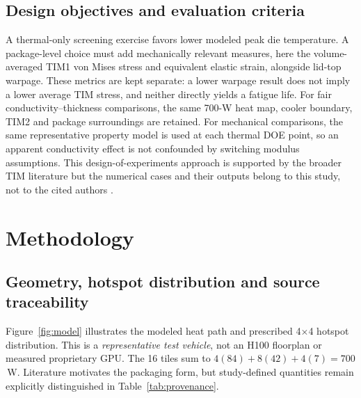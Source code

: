 \documentclass[10pt,a4paper]{article}
\begin{document}
\subsection{Design objectives and evaluation criteria}
A thermal-only screening exercise favors lower modeled peak die temperature. A package-level choice must
add mechanically relevant measures, here the volume-averaged TIM1 von Mises stress and equivalent elastic strain,
alongside lid-top warpage. These metrics are kept separate: a lower warpage result does not imply a lower
average TIM stress, and neither directly yields a fatigue life. For fair conductivity--thickness comparisons,
the same 700-W heat map, cooler boundary, TIM2 and package surroundings are retained.
For mechanical comparisons, the same representative property model is used at each thermal DOE point,
so an apparent conductivity effect is not confounded by switching modulus assumptions.
This design-of-experiments approach is supported by the broader TIM literature but the numerical cases
and their outputs belong to this study, not to the cited authors \citep{prasher2006,subramanian2019}.

\section{Methodology}
\subsection{Geometry, hotspot distribution and source traceability}
Figure~\ref{fig:model} illustrates the modeled heat path and prescribed 4$\times$4 hotspot distribution.
This is a \emph{representative test vehicle}, not an H100 floorplan or measured proprietary GPU.
The 16 tiles sum to $4(84)+8(42)+4(7)=700$\,W. Literature motivates the packaging form,
but study-defined quantities remain explicitly distinguished in Table~\ref{tab:provenance}.
\end{document}
